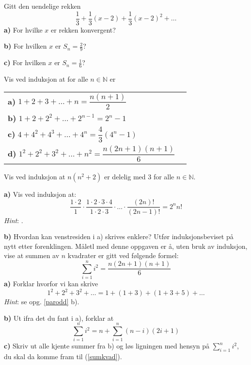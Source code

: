 Gitt den uendelige rekken
\[\frac{1}{3} +\frac{1}{3}(x-2)+ \frac{1}{3}(x-2)^2+\ldots\]
\textbf{a)} For hvilke $ x $ er rekken konvergent? \os

\textbf{b)} For hvilken $ x $ er $ S_n = \frac{2}{9} $?\os

\textbf{c)} For hvilken $ x $ er $ S_n= \frac{1}{6}$? \os

\nes
{}
Vis ved induksjon at for alle $ n\in \mathbb{N} $ er\\[10pt]
\begin{tabular}{@{}l l}	
	\textbf{a)} $ 1+2+3+\ldots+n = \dfrac{n(n+1)}{2} $ \\[10pt]
	\textbf{b)} $ 1+2 +2^2 +\ldots+ 2^{n-1}= 2^n-1$\\[10pt]
	\textbf{c)} $ 4+4^2+4^3+\ldots+4^n = \dfrac{4}{3}(4^n-1) $ \\[10pt]
	\textbf{d)} $ 1^2 + 2^2+3^2+ \ldots+ n^2 = \dfrac{n(2n+1)(n+1)}{6} $ 
\end{tabular} 

Vis ved induksjon at $ n(n^2+2) $ er delelig med 3 for alle $ n\in\mathbb{N} $.

\textbf{a)}
Vis ved induksjon at:
\[\frac{1\cdot2}{1}\cdot\frac{1\cdot2\cdot3\cdot4}{1\cdot2\cdot3}\cdot
\ldots\cdot\frac{(2n)!}{(2n-1)!}=2^n n! \]
\textsl{Hint}: .\os

\textbf{b)} Hvordan kan venstresiden i a) skrives enklere? Utfør induksjonsbeviset på nytt etter forenklingen.
\newpage
{}
Måletl med denne oppgaven er å, uten bruk av induksjon, vise at summen av $ n $ kvadrater er gitt ved følgende formel:
\[ \sum\limits_{i=1}^n i^2 = \frac{n(2n+1)(n+1)}{6} \tag{I}\label{sumkvad}\]
\textbf{a)} Forklar hvorfor vi kan skrive
\[ 1^2 + 2^2 + 3^2+\ldots = 1 + (1+3) + (1+3+5)+ \ldots  \]
\textsl{Hint}: se opg. \ref{parodd} b).\os

\textbf{b)} Ut ifra det du fant i a), forklar at
\[ \sum\limits_{i=1}^n i^2 = n+\sum\limits_{i=1}^n (n-i)(2i+1)  \]
\textbf{c)} Skriv ut alle kjente summer fra b) og løs ligningen med hensyn på $ \sum\limits_{i=1}^n i^2 $, du skal da komme fram til (\ref{sumkvad}).

\begin{comment}
\op{eksplar}
Finn det eksplisitte uttrykket til den aritmetiske rekken når du vet at:
\os
\begin{tabular}{@{}l l}	
\textbf{a)} $ a_1=-5 $ og $ a_8=44 $. \os 
\textbf{b)} $ a_7=39 $ og $ d=6 $. \os
\textbf{c)} $ a_5 = 16 $ og $ a_{10} = 31 $
\end{tabular}
\end{comment}